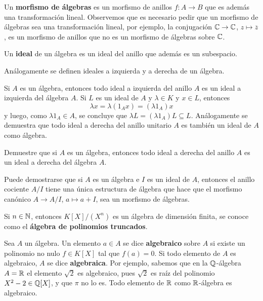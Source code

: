 Un \textbf{morfismo de álgebras} es un morfismo de anillos $f\colon A\to B$ que es además una transformación lineal. Observemos 
que es necesario pedir que un morfismo de álgebras sea una transformación lineal, por ejemplo, la conjugación 
$\mathbb{C}\to \mathbb{C}$, $z\mapsto\overline{z}$, es un morfismo de anillos que no es un morfismo de álgebras sobre $\mathbb{C}$. 

\begin{definition}
	Un \textbf{ideal} de un álgebra es un ideal del anillo que además es un
	subespacio. 
\end{definition}

Análogamente se definen ideales a izquierda y a derecha de un álgebra.

	Si $A$ es un álgebra, entonces todo ideal a izquierda 
	del anillo $A$ es un ideal a izquierda del
	álgebra $A$. Si $L$ es un ideal de $A$ y $\lambda\in K$ y $x\in L$,
	entonces
	\[
		\lambda x=\lambda (1_Ax)=(\lambda 1_A)x
	\]
	y luego, como $\lambda 1_A\in A$, se concluye que $\lambda L=(\lambda
	1_A)L\subseteq L$. Análogamente se demuestra que todo ideal a derecha del
	anillo unitario $A$ es también un ideal de $A$ como álgebra. 

\begin{exercise}
	Demuestre que si $A$ es un álgebra, entonces todo ideal a derecha
	del anillo $A$ es un ideal a derecha del álgebra $A$.
\end{exercise}

Puede demostrarse que si 
$A$ es un álgebra e $I$ es un ideal de $A$, entonces el anillo cociente $A/I$ 
tiene una única estructura de álgebra que hace que el morfismo canónico 
$A\to A/I$, $a\mapsto a+I$, sea un morfismo de álgebras. 

\begin{example}
Si $n\in\mathbb{N}$, entonces $K[X]/(X^n)$ es un álgebra de dimensión finita, se conoce como el \textbf{álgebra de polinomios truncados}.  \end{example}

Sea $A$ un álgebra. Un elemento $a\in A$ se dice
\textbf{algebraico} sobre $A$ si existe un polinomio no nulo $f\in K[X]$
tal que $f(a)=0$. Si todo elemento de $A$ es algebraico, $A$ se dice
\textbf{algebraica}. Por ejemplo, sabemos que en la $\mathbb{Q}$-álgebra $A=\mathbb{R}$ el elemento $\sqrt{2}$ es algebraico, pues $\sqrt{2}$ es raíz del polinomio $X^2-2\in\mathbb{Q}[X]$,  
y que $\pi$ no lo es. Todo elemento de $\mathbb{R}$ como $\mathbb{R}$-álgebra es algebraico.


